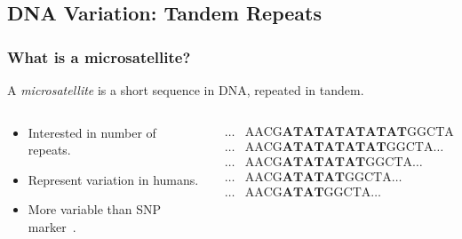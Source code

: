 \documentclass[11pt]{beamer}
\begin{document}
	\subsection{DNA Variation: Tandem Repeats}\label{subsec:dvtr}
    \begin{frame}
        \frametitle{What is a microsatellite?}
        \begin{definition}[Microsatellite]
            A \emph{microsatellite} is a short sequence in DNA, repeated in tandem.
        \end{definition} \bigskip

        \begin{columns}
            \begin{column}{0.4\textwidth}
                \begin{itemize}
                    \item Interested in number of repeats.
                    \item Represent variation in humans.
                    \item More variable than SNP marker~\cite{gemayelJunkVariableTandemRepeats2012}.
                \end{itemize}
            \end{column}
            \begin{column}{0.6\textwidth}
                \begin{equation*}
                    \begin{aligned}
                         \ldots &\text{AACG}\textbf{ATATATATATAT}\text{GGCTA} \ldots \\
                         \ldots &\text{AACG}\textbf{ATATATATAT}\text{GGCTA} \ldots \\
                         \ldots &\text{AACG}\textbf{ATATATAT}\text{GGCTA} \ldots \\
                         \ldots &\text{AACG}\textbf{ATATAT}\text{GGCTA} \ldots \\
                         \ldots &\text{AACG}\textbf{ATAT}\text{GGCTA} \ldots
                    \end{aligned}
                \end{equation*}
            \end{column}
        \end{columns}


\end{frame}
\end{document}

